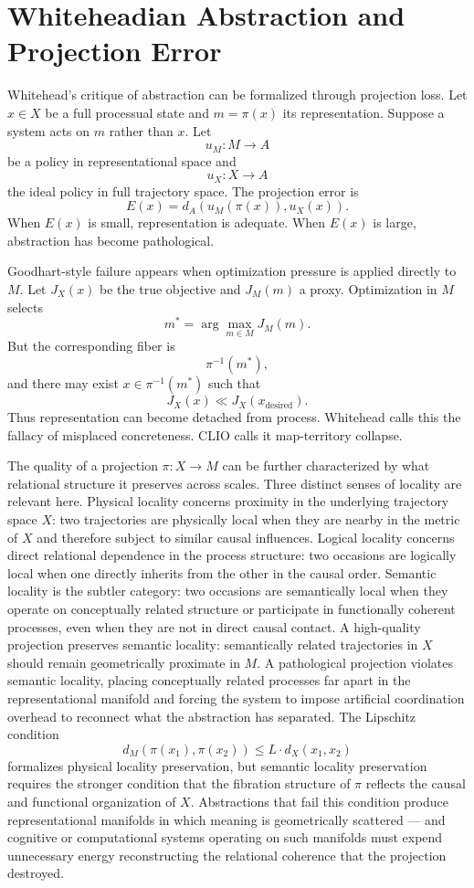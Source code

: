\documentclass[12pt,a4paper]{article}
\begin{document}
\section{Whiteheadian Abstraction and Projection Error}

Whitehead's critique of abstraction can be formalized through projection loss. Let \(x\in X\) be a full processual state and \(m=\pi(x)\) its representation. Suppose a system acts on \(m\) rather than \(x\). Let
\[
u_M : M \to A
\]
be a policy in representational space and
\[
u_X : X \to A
\]
the ideal policy in full trajectory space. The projection error is
\[
E(x)=d_A(u_M(\pi(x)),u_X(x)).
\]
When \(E(x)\) is small, representation is adequate. When \(E(x)\) is large, abstraction has become pathological.

Goodhart-style failure appears when optimization pressure is applied directly to \(M\). Let \(J_X(x)\) be the true objective and \(J_M(m)\) a proxy. Optimization in \(M\) selects
\[
m^\ast=\arg\max_{m\in M}J_M(m).
\]
But the corresponding fiber is
\[
\pi^{-1}(m^\ast),
\]
and there may exist \(x\in\pi^{-1}(m^\ast)\) such that
\[
J_X(x)\ll J_X(x_{\mathrm{desired}}).
\]
Thus representation can become detached from process. Whitehead calls this the fallacy of misplaced concreteness. CLIO calls it map-territory collapse.

The quality of a projection \(\pi : X \to M\) can be further characterized by what relational structure it preserves across scales. Three distinct senses of locality are relevant here. Physical locality concerns proximity in the underlying trajectory space \(X\): two trajectories are physically local when they are nearby in the metric of \(X\) and therefore subject to similar causal influences. Logical locality concerns direct relational dependence in the process structure: two occasions are logically local when one directly inherits from the other in the causal order. Semantic locality is the subtler category: two occasions are semantically local when they operate on conceptually related structure or participate in functionally coherent processes, even when they are not in direct causal contact. A high-quality projection preserves semantic locality: semantically related trajectories in \(X\) should remain geometrically proximate in \(M\). A pathological projection violates semantic locality, placing conceptually related processes far apart in the representational manifold and forcing the system to impose artificial coordination overhead to reconnect what the abstraction has separated. The Lipschitz condition
\[
d_M(\pi(x_1), \pi(x_2)) \leq L \cdot d_X(x_1, x_2)
\]
formalizes physical locality preservation, but semantic locality preservation requires the stronger condition that the fibration structure of \(\pi\) reflects the causal and functional organization of \(X\). Abstractions that fail this condition produce representational manifolds in which meaning is geometrically scattered — and cognitive or computational systems operating on such manifolds must expend unnecessary energy reconstructing the relational coherence that the projection destroyed.
\end{document}

